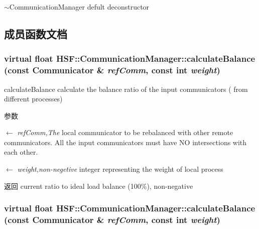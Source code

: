 $\sim$CommunicationManager defult deconstructor 

\subsection{成员函数文档}
\hypertarget{classHSF_1_1CommunicationManager_a7793e296e5d433a312894b1d59ddb0a5}{
\subsubsection[{calculateBalance}]{\setlength{\rightskip}{0pt plus 5cm}virtual float HSF::CommunicationManager::calculateBalance (const {\bf Communicator} \& {\em refComm}, \/  const int {\em weight})}}
\label{classHSF_1_1CommunicationManager_a7793e296e5d433a312894b1d59ddb0a5}


calculateBalance calculate the balance ratio of the input communicators ( from different processes) 
\begin{DoxyParams}{参数}
\item[\mbox{$\leftarrow$} {\em refComm,The}]local communicator to be rebalanced with other remote communicators. All the input communicators must have NO intersections with each other. \item[\mbox{$\leftarrow$} {\em weight,non-\/negetive}]integer representing the weight of local process \end{DoxyParams}
\begin{DoxyReturn}{返回}
current ratio to ideal load balance (100\%), non-\/negative 
\end{DoxyReturn}
\hypertarget{classHSF_1_1CommunicationManager_a7793e296e5d433a312894b1d59ddb0a5}{
\subsubsection[{calculateBalance}]{\setlength{\rightskip}{0pt plus 5cm}virtual float HSF::CommunicationManager::calculateBalance (const {\bf Communicator} \& {\em refComm}, \/  const int {\em weight})}}
\label{classHSF_1_1CommunicationManager_a7793e296e5d433a312894b1d59ddb0a5}


